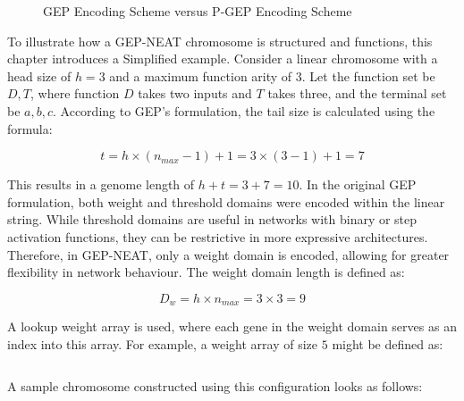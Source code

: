 \parbreak
\begin{figure}[H] %
	\centering %
	\caption{GEP Encoding Scheme versus P-GEP Encoding Scheme}
	\label{fig:gep_neat_p_gep} %
\end{figure}

\parbreak\noindent To illustrate how a GEP-NEAT chromosome is structured and functions, this chapter introduces a Simplified example. Consider a linear chromosome with a head size of $h = 3$ and a maximum function arity of $3$. Let the function set be ${D, T}$, where function $D$ takes two inputs and $T$ takes three, and the terminal set be ${a, b, c}$. According to GEP's formulation, the tail size is calculated using the formula:
\begin{ceqn}
	\begin{equation}
		t = h \times (n_{max} - 1) + 1 = 3 \times (3 - 1) + 1 = 7
	\end{equation}
\end{ceqn}

\noindent This results in a genome length of $h + t = 3 + 7 = 10$. In the original GEP formulation, both weight and threshold domains were encoded within the linear string. While threshold domains are useful in networks with binary or step activation functions, they can be restrictive in more expressive architectures. Therefore, in GEP-NEAT, only a weight domain is encoded, allowing for greater flexibility in network behaviour. The weight domain length is defined as:
\begin{ceqn}
	\begin{equation}
		D_w = h \times n_{max} = 3 \times 3 = 9
	\end{equation}
\end{ceqn}

\noindent A lookup weight array is used, where each gene in the weight domain serves as an index into this array. For example, a weight array of size $5$ might be defined as:
\begin{ceqn}
	\begin{equation}
		[-1.2, 2.3, 3.2, 4.4, -0.5, 6.0]
	\end{equation}
\end{ceqn}

\noindent A sample chromosome constructed using this configuration looks as follows:

